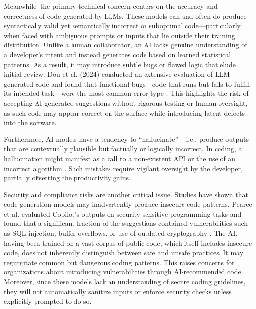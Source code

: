 Meanwhile, the primary technical concern centers on the accuracy and correctness of code generated by \glspl{LLM}. These models can and often do produce syntactically valid yet semantically incorrect or suboptimal code—particularly when faced with ambiguous prompts or inputs that lie outside their training distribution. Unlike a human collaborator, an \gls{AI} lacks genuine understanding of a developer’s intent and instead generates code based on learned statistical patterns. As a result, it may introduce subtle bugs or flawed logic that elude initial review. Dou et al. (2024) conducted an extensive evaluation of \gls{LLM}-generated code and found that functional bugs—code that runs but fails to fulfill its intended task—were the most common error type \autocite{Dou2024}. This highlights the risk of accepting \gls{AI}-generated suggestions without rigorous testing or human oversight, as such code may appear correct on the surface while introducing latent defects into the software.

Furthermore, \gls{AI} models have a tendency to “hallucinate” – i.e., produce outputs that are contextually plausible but factually or logically incorrect. In coding, a hallucination might manifest as a call to a non-existent API or the use of an incorrect algorithm \autocite{Tian2024}. Such mistakes require vigilant oversight by the developer, partially offsetting the productivity gains.

Security and compliance risks are another critical issue. Studies have shown that code generation models may inadvertently produce insecure code patterns. Pearce et al. evaluated Copilot’s outputs on security-sensitive programming tasks and found that a significant fraction of the suggestions contained vulnerabilities such as SQL injection, buffer overflows, or use of outdated cryptography \autocite{Pearce2022}. The \gls{AI}, having been trained on a vast corpus of public code, which itself includes insecure code, does not inherently distinguish between safe and unsafe practices. It may regurgitate common but dangerous coding patterns. This raises concerns for organizations about introducing vulnerabilities through \gls{AI}-recommended code. Moreover, since these models lack an understanding of secure coding guidelines, they will not automatically sanitize inputs or enforce security checks unless explicitly prompted to do so.

